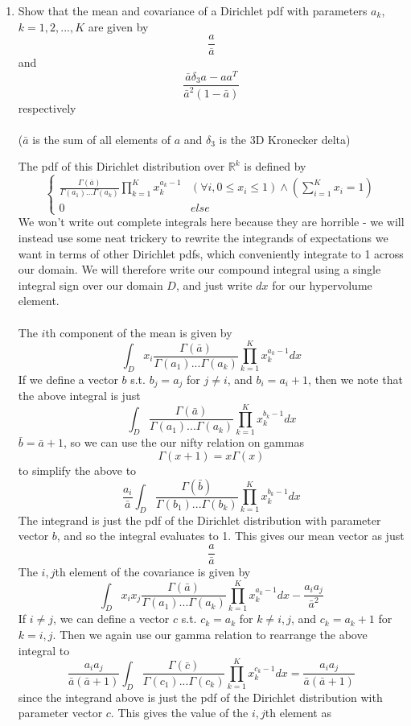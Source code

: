 \documentclass{article}
\newcommand{\chapternumber}{2}
\newenvironment{QandA}{\begin{enumerate}[label=\chapternumber.\arabic*]\bfseries\boldmath}
	{\end{enumerate}}
\newenvironment{answered}{\par\bigskip\normalfont\unboldmath}{}
\begin{document}
\begin{QandA}
	\item Show that the mean and covariance of a Dirichlet pdf with parameters $a_k$, $k=1,2,...,K$ are given by
	\[\frac{a}{\bar{a}}\]
	and
	\[\frac{\bar{a}\delta_3a-aa^T}{\bar{a}^2(1-\bar{a})}\]
	respectively\\
	\\
	($\bar{a}$ is the sum of all elements of $a$ and $\delta_3$ is the 3D Kronecker delta)
	\begin{answered}
		The pdf of this Dirichlet distribution over $\mathbb{R}^k$ is defined by
		\[\begin{cases}
		\frac{\Gamma(\bar{a})}{\Gamma(a_1)...\Gamma(a_k)}\prod_{k=1}^Kx_k^{a_k-1} & (\forall i,0\leq x_i\leq 1)\land(\sum_{i=1}^{K}x_i=1)\\
		0 & else
		\end{cases}\]
		We won't write out complete integrals here because they are horrible - we will instead use some neat trickery to rewrite the integrands of expectations we want in terms of other Dirichlet pdfs, which conveniently integrate to 1 across our domain. We will therefore write our compound integral using a single integral sign over our domain $D$, and just write $dx$ for our hypervolume element.\\
		\\
		The $i$th component of the mean is given by
		\[\int_Dx_i\frac{\Gamma(\bar{a})}{\Gamma(a_1)...\Gamma(a_k)}\prod_{k=1}^Kx_k^{a_k-1}dx\]
		If we define a vector $b$ s.t. $b_j=a_j$ for $j\neq i$, and $b_i=a_i+1$, then we note that the above integral is just
		\[\int_D\frac{\Gamma(\bar{a})}{\Gamma(a_1)...\Gamma(a_k)}\prod_{k=1}^Kx_k^{b_k-1}dx\]
		$\bar{b}=\bar{a}+1$, so we can use the our nifty relation on gammas \[\Gamma(x+1)=x\Gamma(x)\]
		to simplify the above to
		\[\frac{a_i}{\bar{a}}\int_D\frac{\Gamma(\bar{b})}{\Gamma(b_1)...\Gamma(b_k)}\prod_{k=1}^Kx_k^{b_k-1}dx\]
		The integrand is just the pdf of the Dirichlet distribution with parameter vector $b$, and so the integral evaluates to 1. This gives our mean vector as just
		\[\frac{a}{\bar{a}}\]
		The $i,j$th element of the covariance is given by
			\[\int_Dx_ix_j\frac{\Gamma(\bar{a})}{\Gamma(a_1)...\Gamma(a_k)}\prod_{k=1}^Kx_k^{a_k-1}dx-\frac{a_ia_j}{\bar{a}^2}\]
		If $i\neq j$, we can define a vector $c$ s.t. $c_k=a_k$ for $k\neq i,j$, and $c_k=a_k+1$ for $k=i,j$. Then we again use our gamma relation to rearrange the above integral to \[\frac{a_ia_j}{\bar{a}(\bar{a}+1)}\int_D\frac{\Gamma(\bar{c})}{\Gamma(c_1)...\Gamma(c_k)}\prod_{k=1}^Kx_k^{c_k-1}dx=\frac{a_ia_j}{\bar{a}(\bar{a}+1)}\]
		since the integrand above is just the pdf of the Dirichlet distribution with parameter vector $c$. This gives the value of the $i,j$th element as

\end{answered}
\end{QandA}
\end{document}
